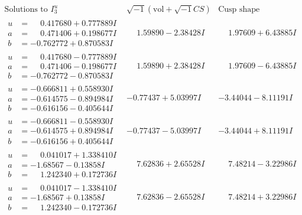 \documentclass[1p]{elsarticle_modified}
\theoremstyle{definition}
\newcommand{\I}{\sqrt{-1}}
\begin{document}
$$\begin{array}{c|c|c}  
\text{Solutions to }I^u_{3}& \I (\text{vol} + \sqrt{-1}CS) & \text{Cusp shape}\\
 \hline 
\begin{aligned}
u &= \phantom{-}0.417680 + 0.777889 I \\
a &= \phantom{-}0.471406 + 0.198677 I \\
b &= -0.762772 + 0.870583 I\end{aligned}
 & \phantom{-}1.59890 - 2.38428 I & \phantom{-}1.97609 + 6.43885 I \\ \hline\begin{aligned}
u &= \phantom{-}0.417680 - 0.777889 I \\
a &= \phantom{-}0.471406 - 0.198677 I \\
b &= -0.762772 - 0.870583 I\end{aligned}
 & \phantom{-}1.59890 + 2.38428 I & \phantom{-}1.97609 - 6.43885 I \\ \hline\begin{aligned}
u &= -0.666811 + 0.558930 I \\
a &= -0.614575 - 0.894984 I \\
b &= -0.616156 - 0.405644 I\end{aligned}
 & -0.77437 + 5.03997 I & -3.44044 - 8.11191 I \\ \hline\begin{aligned}
u &= -0.666811 - 0.558930 I \\
a &= -0.614575 + 0.894984 I \\
b &= -0.616156 + 0.405644 I\end{aligned}
 & -0.77437 - 5.03997 I & -3.44044 + 8.11191 I \\ \hline\begin{aligned}
u &= \phantom{-}0.041017 + 1.338410 I \\
a &= -1.68567 - 0.13858 I \\
b &= \phantom{-}1.242340 + 0.172736 I\end{aligned}
 & \phantom{-}7.62836 + 2.65528 I & \phantom{-}7.48214 - 3.22986 I \\ \hline\begin{aligned}
u &= \phantom{-}0.041017 - 1.338410 I \\
a &= -1.68567 + 0.13858 I \\
b &= \phantom{-}1.242340 - 0.172736 I\end{aligned}
 & \phantom{-}7.62836 - 2.65528 I & \phantom{-}7.48214 + 3.22986 I \\ \hline\begin{aligned}

\end{aligned}
\end{array}$$
\end{document}
